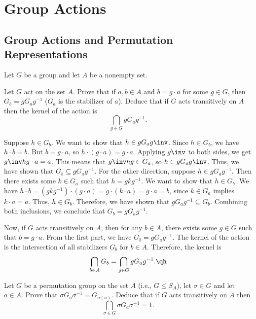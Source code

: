 \section{Group Actions}

\subsection{Group Actions and Permutation Representations}

Let $G$ be a group and let $A$ be a nonempty set.

\begin{exercise}
	Let $G$ act on the set $A$. Prove that if $a,b \in A$ and $b = g \cdot a$ for some $g \in G$, then \(G_b = g G_a g^{-1}\) (\(G_a\) is the stabilizer of $a$). Deduce that if $G$ acts transitively on $A$ then the kernel of the action is
	\[\bigcap_{g \in G} g G_a g^{-1}.\]
\end{exercise}

\begin{sol}
	Suppose $h \in G_b$. We want to show that $h \in gG_ag\inv$. Since $h \in G_b$, we have $h \cdot b = b$. But $b = g \cdot a$, so $h \cdot (g \cdot a) = g \cdot a$. Applying $g\inv$ to both sides, we get $g\inv h g \cdot a = a$. This means that $g\inv h g \in G_a$, so $h \in g G_a g\inv$. Thus, we have shown that \(G_b \subseteq g G_a g^{-1}\). For the other direction, suppose $h \in g G_a g^{-1}$. Then there exists some $k \in G_a$ such that $h = g k g^{-1}$. We want to show that $h \in G_b$. We have $h \cdot b = (g k g^{-1}) \cdot (g \cdot a) = g \cdot (k \cdot a) = g \cdot a = b$, since $k \in G_a$ implies $k \cdot a = a$. Thus, $h \in G_b$. Therefore, we have shown that \(g G_a g^{-1} \subseteq G_b\). Combining both inclusions, we conclude that \(G_b = g G_a g^{-1}\).

	Now, if $G$ acts transitively on $A$, then for any $b \in A$, there exists some $g \in G$ such that $b = g \cdot a$. From the first part, we have \(G_b = g G_a g^{-1}\). The kernel of the action is the intersection of all stabilizers \(G_b\) for \(b \in A\). Therefore, the kernel is
	\[\bigcap_{b \in A} G_b = \bigcap_{g \in G} g G_a g^{-1}. \qh\]
\end{sol}

\begin{exercise}
	Let $G$ be a permutation group on the set $A$ (i.e., \(G \leq S_A\)), let \(\sigma \in G\) and let \(a \in A\). Prove that \(\sigma G_a \sigma^{-1} = G_{\sigma(a)}\). Deduce that if $G$ acts transitively on $A$ then 
	\[\bigcap_{\sigma \in G} \sigma G_a \sigma^{-1} = 1.\]
\end{exercise}

